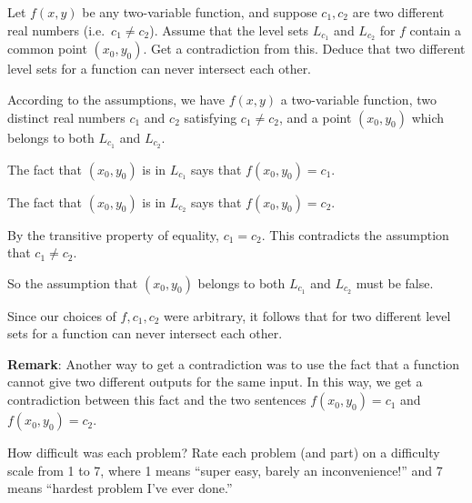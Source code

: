 \begin{problem}
  Let $f(x,y)$ be any two-variable function, and suppose $c_1,c_2$ are two different real numbers (i.e.\ $c_1\neq c_2$). Assume that the level sets $L_{c_1}$ and $L_{c_2}$ for $f$ contain a common point $(x_0,y_0)$. Get a contradiction from this. Deduce that two different level sets for a function can never intersect each other.
\end{problem}
\begin{solution}
  According to the assumptions, we have $f(x,y)$ a two-variable function, two distinct real numbers $c_1$ and $c_2$ satisfying $c_1\neq c_2$, and a point $(x_0,y_0)$ which belongs to both $L_{c_1}$ and $L_{c_2}$.

  The fact that $(x_0,y_0)$ is in $L_{c_1}$ says that $f(x_0,y_0)=c_1$.

  The fact that $(x_0,y_0)$ is in $L_{c_2}$ says that $f(x_0,y_0)=c_2$.

  By the transitive property of equality, $c_1=c_2$. This contradicts the assumption that $c_1\neq c_2$.

  So the assumption that $(x_0,y_0)$ belongs to both $L_{c_1}$ and $L_{c_2}$ must be false.

  Since our choices of $f, c_1,c_2$ were arbitrary, it follows that for two different level sets for a function can never intersect each other.

  \textbf{Remark}: Another way to get a contradiction was to use the fact that a function cannot give two different outputs for the same input. In this way, we get a contradiction between this fact and the two sentences $f(x_0,y_0)=c_1$ and $f(x_0,y_0)=c_2$.
\end{solution}

\begin{problem}
  How difficult was each problem? Rate each problem (and part) on a difficulty scale from 1 to 7, where 1 means ``super easy, barely an inconvenience!'' and 7 means ``hardest problem I've ever done.''
\end{problem}

\newpage

